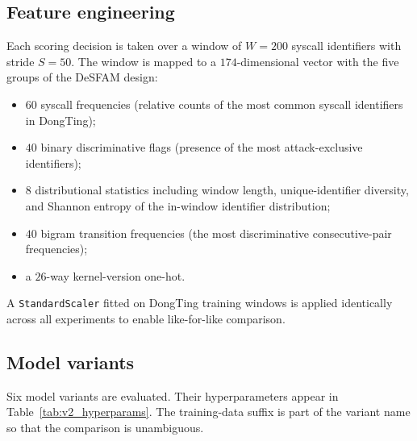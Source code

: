 \subsection{Feature engineering}
\label{subsec:features}
Each scoring decision is taken over a window of $W=200$ syscall
identifiers with stride $S=50$. The window is mapped to a
$174$-dimensional vector with the five groups of the DeSFAM design:
\begin{itemize}
  \item $60$ syscall frequencies (relative counts of the most common
        syscall identifiers in DongTing);
  \item $40$ binary discriminative flags (presence of the most
        attack-exclusive identifiers);
  \item $8$ distributional statistics including window length,
        unique-identifier diversity, and Shannon entropy of the
        in-window identifier distribution;
  \item $40$ bigram transition frequencies (the most discriminative
        consecutive-pair frequencies);
  \item a $26$-way kernel-version one-hot.
\end{itemize}
A \texttt{StandardScaler} fitted on DongTing training windows is
applied identically across all experiments to enable like-for-like
comparison.

\subsection{Model variants}
\label{subsec:models}
Six model variants are evaluated. Their hyperparameters appear in
Table~\ref{tab:v2_hyperparams}. The training-data suffix is part of
the variant name so that the comparison is unambiguous.

